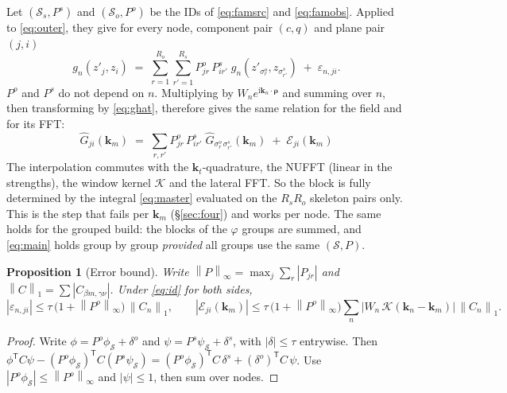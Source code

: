 \documentclass[11pt,a4paper]{article}
\newcommand{\kt}{\mathbf{k}_t}
\newcommand{\kn}{\mathbf{k}_n}
\newcommand{\km}{\mathbf{k}_m}
\newcommand{\bfrho}{\boldsymbol{\rho}}
\newcommand{\Ghat}{\widehat{G}}
\newcommand{\ii}{\mathrm{i}}
\newcommand{\abs}[1]{\left\lvert #1 \right\rvert}
\newcommand{\norm}[1]{\left\lVert #1 \right\rVert}
\newtheorem{proposition}{Proposition}
\theoremstyle{remark}
\begin{document}
Let $(\mathcal S_s, P^s)$ and $(\mathcal S_o, P^o)$ be the IDs of \eqref{eq:famsrc} and \eqref{eq:famobs}. Applied to
\eqref{eq:outer}, they give for every node, component pair $(c,q)$ and plane pair $(j,i)$
\begin{equation}
  g_n(z'_j, z_i) \;=\; \sum_{r=1}^{R_o}\sum_{r'=1}^{R_s} P^o_{jr}\,P^s_{ir'}\; g_n(z'_{\sigma^o_r}, z_{\sigma^s_{r'}})
  \;+\; \varepsilon_{n,ji}.
  \label{eq:node_interp}
\end{equation}
$P^o$ and $P^s$ do not depend on $n$. Multiplying by $W_n e^{\ii\kn\cdot\bfrho}$ and summing over $n$, then
transforming by \eqref{eq:ghat}, therefore gives the same relation for the field and for its FFT:
\begin{equation}
  \boxed{\;\Ghat_{ji}(\km) \;=\; \sum_{r,r'} P^o_{jr}\,P^s_{ir'}\;\Ghat_{\sigma^o_r\,\sigma^s_{r'}}(\km) \;+\; \mathcal{E}_{ji}(\km)\;}
  \label{eq:main}
\end{equation}
The interpolation commutes with the $\kt$-quadrature, the NUFFT (linear in the strengths), the window kernel
$\mathcal K$ and the lateral FFT. So the block is fully determined by the integral \eqref{eq:master} evaluated
on the $R_sR_o$ skeleton pairs only. This is the step that fails per $\km$ (\S\ref{sec:four}) and works per node.
The same holds for the grouped build: the blocks of the $\varphi$ groups are summed, and \eqref{eq:main} holds
group by group \emph{provided} all groups use the same $(\mathcal S, P)$.

\begin{proposition}[Error bound]
\label{prop:error}
Write $\norm{P}_\infty=\max_j\sum_r\abs{P_{jr}}$ and $\norm{C}_1=\sum\abs{C_{\beta m,\gamma\nu}}$. Under \eqref{eq:id} for both sides,
\begin{equation}
  \abs{\varepsilon_{n,ji}} \le \tau\,\bigl(1+\norm{P^o}_\infty\bigr)\,\norm{C_n}_1,
  \qquad
  \abs{\mathcal{E}_{ji}(\km)} \le \tau\,\bigl(1+\norm{P^o}_\infty\bigr)\sum_n \abs{W_n\,\mathcal{K}(\kn-\km)}\,\norm{C_n}_1 .
\end{equation}
\end{proposition}
\begin{proof}
Write $\phi=P^o\phi_{\mathcal S}+\delta^o$ and $\psi=P^s\psi_{\mathcal S}+\delta^s$, with $\abs{\delta}\le\tau$ entrywise. Then
$\phi^{\mathsf T}C\psi - (P^o\phi_{\mathcal S})^{\mathsf T}C(P^s\psi_{\mathcal S})
= (P^o\phi_{\mathcal S})^{\mathsf T}C\,\delta^s + (\delta^o)^{\mathsf T}C\,\psi$.
Use $\abs{P^o\phi_{\mathcal S}}\le\norm{P^o}_\infty$ and $\abs{\psi}\le1$, then sum over nodes.
\end{proof}
\end{document}
